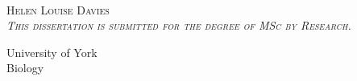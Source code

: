
{
\pagestyle{empty}

\centering
\null\vfill


\fontsize{36.5}{34}\scshape{}
\\[2cm]%

\fontsize{24}{30}\normalfont
Helen Louise Davies\\[0.5cm]%

\fontsize{13}{16}\itshape
This dissertation is submitted for the degree of MSc by Research.

\vfill


\fontsize{16}{20}\normalfont
University of York\\
Biology


\vfill

\fontsize{20}{30}\normalfont
\monthname\space\number\year


\vfill\null

\restoregeometry
}